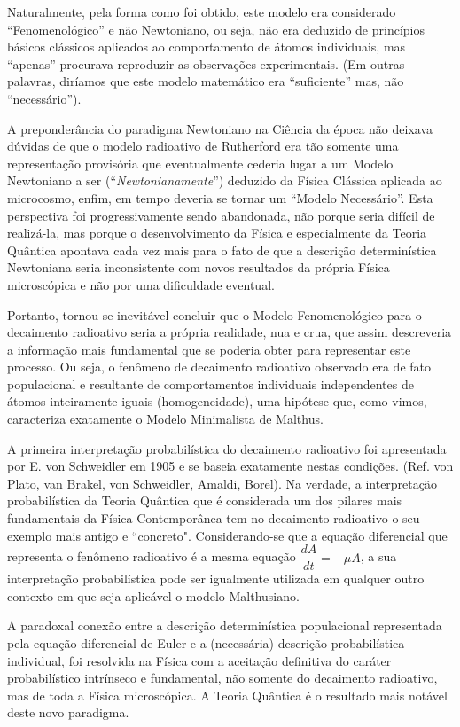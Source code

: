     Naturalmente, pela forma como foi obtido, este modelo era considerado ``Fenomenológico'' e não Newtoniano, ou seja, não era deduzido de princípios básicos clássicos aplicados ao comportamento de átomos individuais, mas ``apenas'' procurava reproduzir as observações experimentais. (Em outras palavras, diríamos que este modelo matemático era ``suficiente'' mas, não ``necessário'').
    
    A preponderância do paradigma Newtoniano na Ciência da época não deixava dúvidas de que o modelo radioativo de Rutherford era tão somente uma representação provisória que eventualmente cederia lugar a um Modelo Newtoniano a ser (``\textit{Newtonianamente}'') deduzido da Física Clássica aplicada ao microcosmo, enfim, em tempo deveria se tornar um ``Modelo Necessário''. Esta perspectiva foi progressivamente sendo abandonada, não porque seria difícil de realizá-la, mas porque o desenvolvimento da Física e especialmente da Teoria Quântica apontava cada vez mais para o fato de que a descrição determinística Newtoniana seria inconsistente com novos resultados da própria Física microscópica e não por uma dificuldade eventual.
    
    Portanto, tornou-se inevitável concluir que o Modelo Fenomenológico para o decaimento radioativo seria a própria realidade, nua e crua, que assim descreveria a informação mais fundamental que se poderia obter para representar este processo. Ou seja, o fenômeno de decaimento radioativo observado era de fato populacional e resultante de comportamentos individuais independentes de átomos inteiramente iguais (homogeneidade), uma hipótese que, como vimos, caracteriza exatamente o Modelo Minimalista de Malthus.
    
    A primeira interpretação probabilística do decaimento radioativo foi apresentada por E. von Schweidler em 1905 e se baseia exatamente nestas condições. (Ref. von Plato, van Brakel, von Schweidler, Amaldi, Borel). Na verdade, a interpretação probabilística da Teoria Quântica que é considerada um dos pilares mais fundamentais da Física Contemporânea tem no decaimento radioativo o seu exemplo mais antigo e ``concreto". Considerando-se que a equação diferencial que representa o fenômeno radioativo é a mesma equação \(\dfrac{dA}{dt} = -\mu A\), a sua interpretação probabilística pode ser igualmente utilizada em qualquer outro contexto em que seja aplicável o modelo Malthusiano.

    A paradoxal conexão entre a descrição determinística populacional representada pela equação diferencial de Euler e a (necessária) descrição probabilística individual, foi resolvida na Física com a aceitação definitiva do caráter probabilístico intrínseco e fundamental, não somente do decaimento radioativo, mas de toda a Física microscópica. A Teoria Quântica é o resultado mais notável deste novo paradigma.

